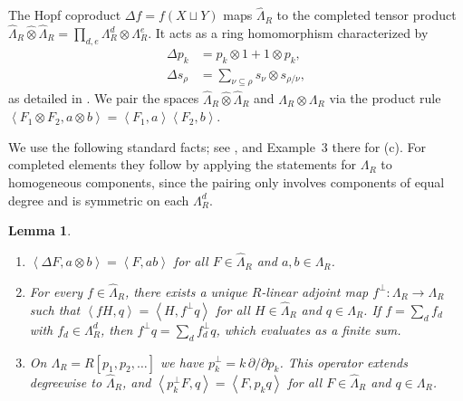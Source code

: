 \documentclass[11pt]{amsart}
\DeclareRobustCommand{\S}{\ensuremath{\mathsection}}
\numberwithin{equation}{section}
\newtheorem{lemma}[theorem]{Lemma}
\theoremstyle{definition}
\theoremstyle{remark}
\newcommand{\Lam}{\Lambda}
\newcommand{\Hall}[2]{\left\langle #1,#2\right\rangle}
\begin{document}
The Hopf coproduct $\Delta f=f(X\sqcup Y)$ maps $\widehat{\Lam}_R$ to the completed tensor product $\widehat{\Lam}_R\widehat{\otimes}\widehat{\Lam}_R=\prod_{d,e}\Lam_R^d\otimes\Lam_R^e$. It acts as a ring homomorphism characterized by
\begin{align*}
 \Delta p_k &= p_k\otimes1+1\otimes p_k, \\
 \Delta s_\rho &= \sum_{\nu\subseteq\rho}s_\nu\otimes s_{\rho/\nu},
\end{align*}
as detailed in \cite[Ch.~I, \S5]{Macdonald}. We pair the spaces $\widehat{\Lam}_R\widehat{\otimes}\widehat{\Lam}_R$ and $\Lam_R\otimes\Lam_R$ via the product rule $\Hall{F_1\otimes F_2}{a\otimes b}=\Hall{F_1}{a}\Hall{F_2}{b}$.

We use the following standard facts; see \cite[Ch.~I, \S5]{Macdonald}, and
Example~3 there for (c). For completed elements they follow by applying the
statements for $\Lam_R$ to homogeneous components, since the pairing only involves components of equal degree and is symmetric on each $\Lam^d_R$. 

\begin{lemma}\label{lem:hopf}
\begin{enumerate}[label=\textup{(\alph*)}, itemsep=0.5em]
\item $\Hall{\Delta F}{a\otimes b}=\Hall{F}{ab}$ for all $F\in\widehat{\Lam}_R$ and $a,b\in\Lam_R$.
\item For every $f\in\widehat{\Lam}_R$, there exists a unique $R$-linear adjoint map $f^\perp\colon\Lam_R\to\Lam_R$ such that $\Hall{fH}{q}=\Hall{H}{f^\perp q}$ for all $H\in\widehat{\Lam}_R$ and $q\in\Lam_R$. If $f=\sum_df_d$ with $f_d\in\Lam^d_R$, then $f^\perp q=\sum_d f_d^\perp q$, which evaluates as a finite sum.
\item On $\Lam_R=R[p_1,p_2,\dots]$ we have $p_k^\perp=k\,\partial/\partial p_k$.
This operator extends degreewise to $\widehat{\Lam}_R$, and
$\Hall{p_k^\perp F}{q}=\Hall{F}{p_kq}$ for all $F\in\widehat{\Lam}_R$ and
$q\in\Lam_R$.
\end{enumerate}
\end{lemma}
\end{document}
